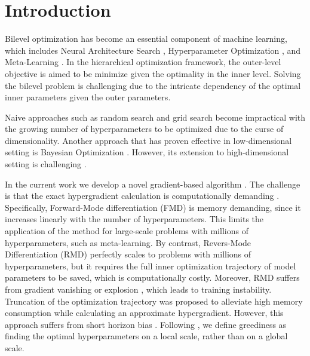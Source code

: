\section{Introduction}
Bilevel optimization has become an essential component of machine learning, which includes Neural Architecture Search \cite{liu2018darts, pham2018efficient, zoph2016neural}, Hyperparameter Optimization \cite{hutter2019automated}, and Meta-Learning \cite{hospedales2021meta, nichol2018first, finn2017model}. In the hierarchical optimization framework, the outer-level objective is aimed to be minimize given the optimality in the inner level. Solving the bilevel problem is challenging due to the intricate dependency of the optimal inner parameters given the outer parameters.

Naive approaches such as random search and grid search \cite{bergstra2012random} become impractical with the growing number of hyperparameters to be optimized due to the curse of dimensionality. Another approach that has proven effective in low-dimensional setting is Bayesian Optimization \cite{snoek2012practical}. However, its extension to high-dimensional setting is challenging \cite{wang2023recent}. 

In the current work we develop a novel gradient-based algorithm \cite{bengio2000gradient}. The challenge is that the exact hypergradient calculation is computationally demanding \cite{franceschi2017forward}. Specifically, Forward-Mode differentiation (FMD) is memory demanding, since it increases linearly with the number of hyperparameters. This limits the application of the method for large-scale problems with millions of hyperparameters, such as meta-learning. By contrast, Revers-Mode Differentiation (RMD) perfectly scales to problems with millions of hyperparameters, but it requires the full inner optimization trajectory of model parameters to be saved, which is computationally costly. Moreover, RMD suffers from gradient vanishing or explosion \cite{antoniou2018train}, which leads to training instability. Truncation of the optimization trajectory was proposed to alleviate high memory consumption \cite{shaban2019truncated} while calculating an approximate hypergradient.
However, this approach suffers from short horizon bias \cite{wu2018understanding}. Following \cite{micaelli2020non}, we define greediness as finding the optimal hyperparameters on a local scale, rather than on a global scale.

